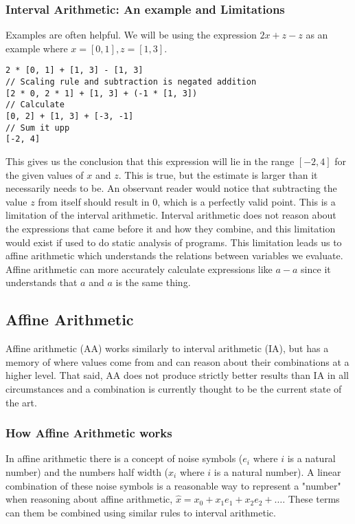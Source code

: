 \documentclass[msc,lith,english]{liuthesis}
\begin{document}
\subsubsection{Interval Arithmetic: An example and Limitations}
Examples are often helpful.
We will be using the expression $2x + z - z$ as an example where $x = [0, 1], z = [1, 3]$.

\begin{verbatim}
2 * [0, 1] + [1, 3] - [1, 3]
// Scaling rule and subtraction is negated addition 
[2 * 0, 2 * 1] + [1, 3] + (-1 * [1, 3])
// Calculate
[0, 2] + [1, 3] + [-3, -1]
// Sum it upp
[-2, 4]
\end{verbatim}

This gives us the conclusion that this expression will lie in the range $[-2, 4]$ for the given values of $x$ and $z$. This is true, but the estimate is larger than it necessarily needs to be. An observant reader would notice that subtracting the value $z$ from itself should result in $0$, which is a perfectly valid point. This is a limitation of the interval arithmetic. Interval arithmetic does not reason about the expressions that came before it and how they combine, and this limitation would exist if used to do static analysis of programs. This limitation leads us to affine arithmetic which understands the relations between variables we evaluate. Affine arithmetic can more accurately calculate expressions like $a - a$ since it understands that $a$ and $a$ is the same thing.


\subsection{Affine Arithmetic}
Affine arithmetic (AA) works similarly to interval arithmetic (IA), but has a memory of where values come from and can reason about their combinations at a higher level. That said, AA does not produce strictly better results than IA in all circumstances and a combination is currently thought to be the current state of the art. 

\subsubsection{How Affine Arithmetic works}
In affine arithmetic there is a concept of noise symbols ($e_i$ where $i$ is a natural number) and the numbers half width ($x_i$ where $i$ is a natural number). A linear combination of these noise symbols is a reasonable way to represent a "number" when reasoning about affine arithmetic, $\hat{x} = x_0 + x_1e_1 + x_2e_2 + \dots$. These terms can them be combined using similar rules to interval arithmetic.
\end{document}

